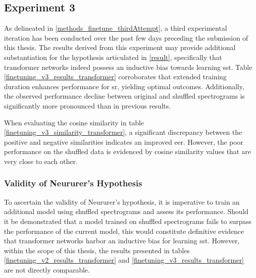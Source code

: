 \subsection{Experiment 3}
\label{results:experiment3}

As delineated in \ref{methods_finetune_thirdAttempt}, a third experimental iteration has been conducted over the past few days preceding the submission of this thesis. The results derived from this experiment may provide additional substantiation for the hypothesis articulated in \ref{result}, specifically that transformer networks indeed possess an inductive bias towards learning \gls{sst}. Table \ref{finetuning_v3_results_transformer} corroborates that extended training duration enhances performance for \gls{sr}, yielding optimal outcomes. Additionally, the observed performance decline between original and shuffled spectrograms is significantly more pronounced than in previous results.

When evaluating the cosine similarity in table \ref{finetuning_v3_similarity_transformer}, a significant discrepancy between the positive and negative similarities indicates an improved \gls{eer}. However, the poor performance on the shuffled data is evidenced by cosine similarity values that are very close to each other.

\subsubsection{Validity of Neururer's Hypothesis}

To ascertain the validity of Neururer's hypothesis, it is imperative to train an additional model using shuffled spectrograms and assess its performance. Should it be demonstrated that a model trained on shuffled spectrograms fails to surpass the performance of the current model, this would constitute definitive evidence that transformer networks harbor an inductive bias for learning \gls{sst}. However, within the scope of this thesis, the results presented in tables \ref{finetuning_v2_results_transformer} and \ref{finetuning_v3_results_transformer} are not directly comparable.


